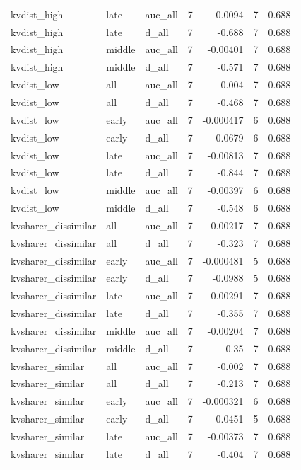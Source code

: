 \begin{table}[t]
\begin{tabular}{lllrrrr}
kvdist\_high & late & auc\_all & 7 & -0.0094 & 7 & 0.688 \\
kvdist\_high & late & d\_all & 7 & -0.688 & 7 & 0.688 \\
kvdist\_high & middle & auc\_all & 7 & -0.00401 & 7 & 0.688 \\
kvdist\_high & middle & d\_all & 7 & -0.571 & 7 & 0.688 \\
kvdist\_low & all & auc\_all & 7 & -0.004 & 7 & 0.688 \\
kvdist\_low & all & d\_all & 7 & -0.468 & 7 & 0.688 \\
kvdist\_low & early & auc\_all & 7 & -0.000417 & 6 & 0.688 \\
kvdist\_low & early & d\_all & 7 & -0.0679 & 6 & 0.688 \\
kvdist\_low & late & auc\_all & 7 & -0.00813 & 7 & 0.688 \\
kvdist\_low & late & d\_all & 7 & -0.844 & 7 & 0.688 \\
kvdist\_low & middle & auc\_all & 7 & -0.00397 & 6 & 0.688 \\
kvdist\_low & middle & d\_all & 7 & -0.548 & 6 & 0.688 \\
kvsharer\_dissimilar & all & auc\_all & 7 & -0.00217 & 7 & 0.688 \\
kvsharer\_dissimilar & all & d\_all & 7 & -0.323 & 7 & 0.688 \\
kvsharer\_dissimilar & early & auc\_all & 7 & -0.000481 & 5 & 0.688 \\
kvsharer\_dissimilar & early & d\_all & 7 & -0.0988 & 5 & 0.688 \\
kvsharer\_dissimilar & late & auc\_all & 7 & -0.00291 & 7 & 0.688 \\
kvsharer\_dissimilar & late & d\_all & 7 & -0.355 & 7 & 0.688 \\
kvsharer\_dissimilar & middle & auc\_all & 7 & -0.00204 & 7 & 0.688 \\
kvsharer\_dissimilar & middle & d\_all & 7 & -0.35 & 7 & 0.688 \\
kvsharer\_similar & all & auc\_all & 7 & -0.002 & 7 & 0.688 \\
kvsharer\_similar & all & d\_all & 7 & -0.213 & 7 & 0.688 \\
kvsharer\_similar & early & auc\_all & 7 & -0.000321 & 6 & 0.688 \\
kvsharer\_similar & early & d\_all & 7 & -0.0451 & 5 & 0.688 \\
kvsharer\_similar & late & auc\_all & 7 & -0.00373 & 7 & 0.688 \\
kvsharer\_similar & late & d\_all & 7 & -0.404 & 7 & 0.688 \\

\end{tabular}
\end{table}
